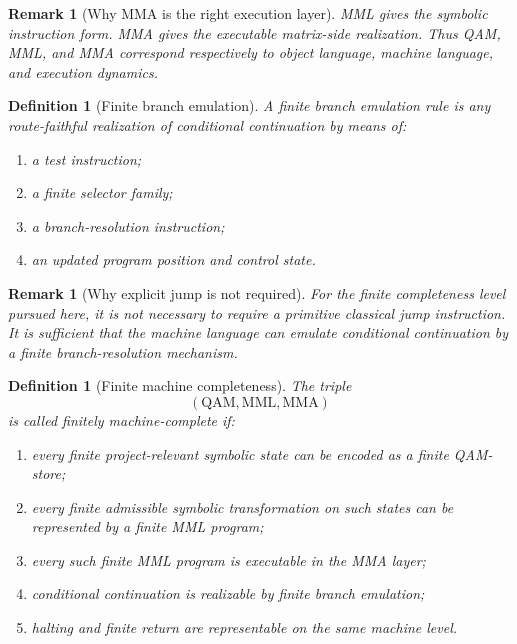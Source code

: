 \documentclass[12pt,a4paper]{article}
\newtheorem{definition}[theorem]{Definition}
\newtheorem{remark}[theorem]{Remark}
\begin{document}
\begin{remark}[Why MMA is the right execution layer]\label{rem:why-mma-is-the-right-execution-layer-computational-layer}
MML gives the symbolic instruction form. MMA gives the executable matrix-side realization. Thus QAM, MML, and MMA correspond respectively to object language, machine language, and execution dynamics.
\end{remark}

\begin{definition}[Finite branch emulation]\label{def:finite-branch-emulation-computational-layer}
A \emph{finite branch emulation rule} is any route-faithful realization of conditional continuation by means of:
\begin{enumerate}[leftmargin=2em]
 \item a test instruction;
 \item a finite selector family;
 \item a branch-resolution instruction;
 \item an updated program position and control state.
\end{enumerate}
\end{definition}

\begin{remark}[Why explicit jump is not required]\label{rem:why-explicit-jump-is-not-required-computational-layer}
For the finite completeness level pursued here, it is not necessary to require a primitive classical jump instruction. It is sufficient that the machine language can emulate conditional continuation by a finite branch-resolution mechanism.
\end{remark}

\begin{definition}[Finite machine completeness]\label{def:finite-machine-completeness-computational-layer}
The triple
\[
(\mathrm{QAM},\mathrm{MML},\mathrm{MMA})
\]
is called \emph{finitely machine-complete} if:
\begin{enumerate}[leftmargin=2em]
 \item every finite project-relevant symbolic state can be encoded as a finite QAM-store;
 \item every finite admissible symbolic transformation on such states can be represented by a finite MML program;
 \item every such finite MML program is executable in the MMA layer;
 \item conditional continuation is realizable by finite branch emulation;
 \item halting and finite return are representable on the same machine level.
\end{enumerate}
\end{definition}
\end{document}
